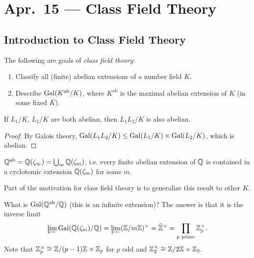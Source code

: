 \chapter{Apr.~15 --- Class Field Theory}

\section{Introduction to Class Field Theory}

\begin{remark}
  The following are goals of \emph{class field theory}:
  \begin{enumerate}
    \item Classify all (finite) abelian
      extensions of a number field $K$.
    \item Describe $\operatorname{Gal}(K^{\mathrm{ab}} / K)$,
      where $K^{\mathrm{ab}}$ is the maximal
      abelian extension of $K$ (in some
      fixed $\overline{K}$).
  \end{enumerate}
\end{remark}

\begin{lemma}
  If $L_1 / K$, $L_2 / K$ are both abelian,
  then $L_1 L_2 / K$ is also abelian.
\end{lemma}

\begin{proof}
  By Galois theory, $\operatorname{Gal}(L_1 L_2 / K) \le \operatorname{Gal}(L_1 / K) \times \operatorname{Gal}(L_2 / K)$,
  which is abelian.
\end{proof}

\begin{theorem}
  $\mathbb{Q}^{\mathrm{ab}} = \mathbb{Q}(\zeta_\infty) = \bigcup_m \mathbb{Q}(\zeta_m)$, i.e.
  every finite abelian extension of $\mathbb{Q}$ is
  contained
  in a cyclotomic extension $\mathbb{Q}(\zeta_m)$ for
  some $m$.
\end{theorem}

\begin{remark}
  Part of the motivation for class field theory
  is to generalize this result to other $K$.

  What is $\operatorname{Gal}(\mathbb{Q}^{\mathrm{ab}} / \mathbb{Q})$ (this
  is an infinite extension)?
  The answer is that it is the inverse limit
  \[
    \varprojlim \operatorname{Gal}(\mathbb{Q}(\zeta_m) / \mathbb{Q})
    = \varprojlim (\mathbb{Z} / m\mathbb{Z})^\times
    = \widehat{\mathbb{Z}}^\times
    = \prod_{p \text{ prime}} \mathbb{Z}_p^\times.
  \]
  Note that $\mathbb{Z}_p^\times \cong \mathbb{Z} / (p - 1)\mathbb{Z} \times \mathbb{Z}_p$
  for $p$ odd and
  $\mathbb{Z}_2^\times \cong \mathbb{Z} / 2\mathbb{Z} \times \mathbb{Z}_2$.
\end{remark}

